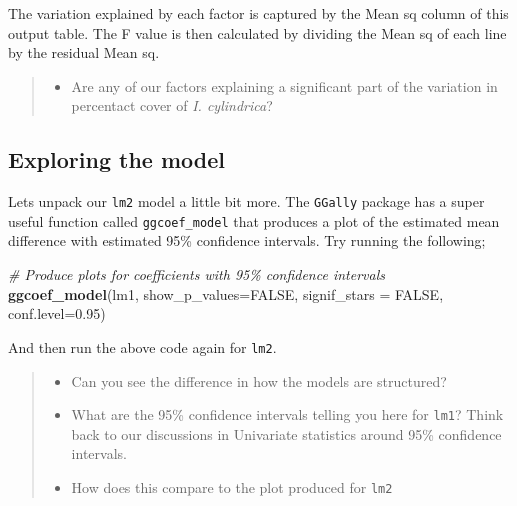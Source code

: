 \documentclass[
]{book}
\newenvironment{Shaded}{\begin{snugshade}}{\end{snugshade}}
\newcommand{\AttributeTok}[1]{\textcolor[rgb]{0.13,0.29,0.53}{#1}}
\newcommand{\CommentTok}[1]{\textcolor[rgb]{0.56,0.35,0.01}{\textit{#1}}}
\newcommand{\ConstantTok}[1]{\textcolor[rgb]{0.56,0.35,0.01}{#1}}
\newcommand{\FloatTok}[1]{\textcolor[rgb]{0.00,0.00,0.81}{#1}}
\newcommand{\FunctionTok}[1]{\textcolor[rgb]{0.13,0.29,0.53}{\textbf{#1}}}
\newcommand{\NormalTok}[1]{#1}
\providecommand{\tightlist}{%
  \setlength{\itemsep}{0pt}\setlength{\parskip}{0pt}}
\begin{document}
The variation explained by each factor is captured by the Mean sq column of this output table. The F value is then calculated by dividing the Mean sq of each line by the residual Mean sq.

\begin{quote}
\begin{itemize}
\tightlist
\item
  Are any of our factors explaining a significant part of the variation in percentact cover of \emph{I. cylindrica}?
\end{itemize}
\end{quote}

\hypertarget{exploring-the-model}{%
\subsection{Exploring the model}\label{exploring-the-model}}

Lets unpack our \texttt{lm2} model a little bit more. The \texttt{GGally} package has a super useful function called \texttt{ggcoef\_model} that produces a plot of the estimated mean difference with estimated 95\% confidence intervals. Try running the following;

\begin{Shaded}
\begin{Highlighting}[]
\CommentTok{\# Produce plots for coefficients with 95\% confidence intervals}
\FunctionTok{ggcoef\_model}\NormalTok{(lm1,}
             \AttributeTok{show\_p\_values=}\ConstantTok{FALSE}\NormalTok{,}
             \AttributeTok{signif\_stars =} \ConstantTok{FALSE}\NormalTok{,}
             \AttributeTok{conf.level=}\FloatTok{0.95}\NormalTok{)}
\end{Highlighting}
\end{Shaded}

And then run the above code again for \texttt{lm2}.

\begin{quote}
\begin{itemize}
\tightlist
\item
  Can you see the difference in how the models are structured?
\item
  What are the 95\% confidence intervals telling you here for \texttt{lm1}? Think back to our discussions in Univariate statistics around 95\% confidence intervals.
\item
  How does this compare to the plot produced for \texttt{lm2}
\end{itemize}
\end{quote}
\end{document}
